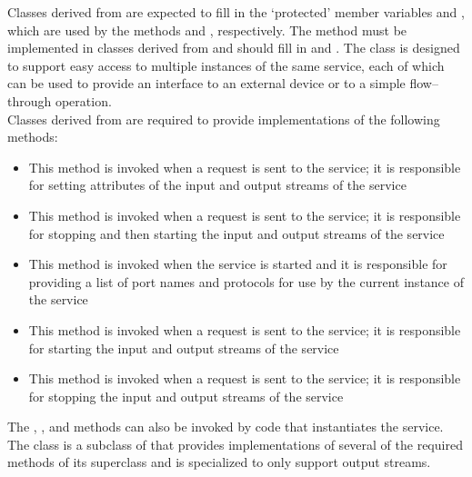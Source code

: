 Classes derived from  are expected to
fill in the `protected' member variables  and
, which are used by the methods
 and , respectively.
The method  must be implemented in classes derived from
 and should fill in
 and .
The 
class is designed to support easy access to multiple instances of the same service, each
of which can be used to provide an interface to an external device or to a simple
flow--through operation.\\

Classes derived from  are
required to provide implementations of the following methods:
\begin{itemize}
\item \textbf{} This method is invoked when a
 request is sent to the service; it
is responsible for setting attributes of the input and output streams of the service
\item \textbf{} This method is invoked when a
 request is sent to the
service; it is responsible for stopping and then starting the input and output streams of
the service
\item \textbf{} This method is invoked when the service is
started and it is responsible for providing a list of port names and protocols for use by
the current instance of the service
\item \textbf{} This method is invoked when a
 request is sent to the service;
it is responsible for starting the input and output streams of the service
\item \textbf{} This method is invoked when a
 request is sent to the service;
it is responsible for stopping the input and output streams of the service
\end{itemize}
The , ,  and
 methods can also be invoked by code that instantiates the service.
The 
class is a subclass of 
that provides implementations of several of the required methods of its superclass and is
specialized to only support output streams.\\

